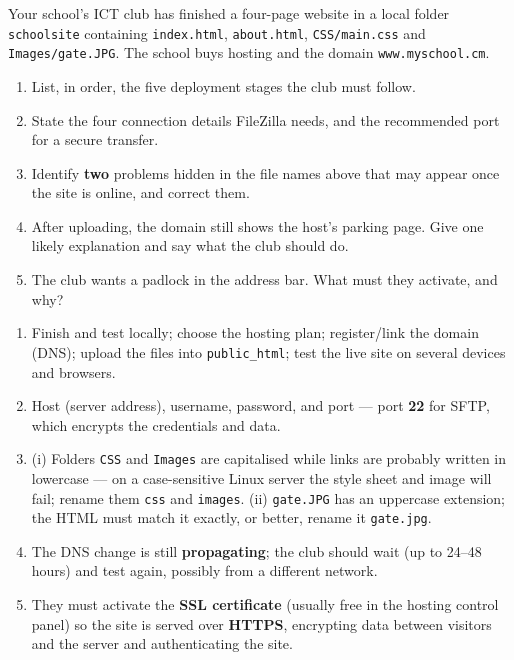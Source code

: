 \documentclass[11pt]{article}
\begin{document}
\begin{exercice}
Your school's ICT club has finished a four-page website in a local folder \texttt{schoolsite} containing \texttt{index.html}, \texttt{about.html}, \texttt{CSS/main.css} and \texttt{Images/gate.JPG}. The school buys hosting and the domain \texttt{www.myschool.cm}.
\begin{enumerate}
\item List, in order, the five deployment stages the club must follow.
\item State the four connection details FileZilla needs, and the recommended port for a secure transfer.
\item Identify \textbf{two} problems hidden in the file names above that may appear once the site is online, and correct them.
\item After uploading, the domain still shows the host's parking page. Give one likely explanation and say what the club should do.
\item The club wants a padlock in the address bar. What must they activate, and why?
\end{enumerate}
\end{exercice}

\begin{corrige}
\begin{enumerate}
\item Finish and test locally; choose the hosting plan; register/link the domain (DNS); upload the files into \texttt{public\_html}; test the live site on several devices and browsers.
\item Host (server address), username, password, and port — port \textbf{22} for SFTP, which encrypts the credentials and data.
\item (i) Folders \texttt{CSS} and \texttt{Images} are capitalised while links are probably written in lowercase — on a case-sensitive Linux server the style sheet and image will fail; rename them \texttt{css} and \texttt{images}. (ii) \texttt{gate.JPG} has an uppercase extension; the HTML must match it exactly, or better, rename it \texttt{gate.jpg}.
\item The DNS change is still \textbf{propagating}; the club should wait (up to 24--48 hours) and test again, possibly from a different network.
\item They must activate the \textbf{SSL certificate} (usually free in the hosting control panel) so the site is served over \textbf{HTTPS}, encrypting data between visitors and the server and authenticating the site.
\end{enumerate}
\end{corrige}
\end{document}
